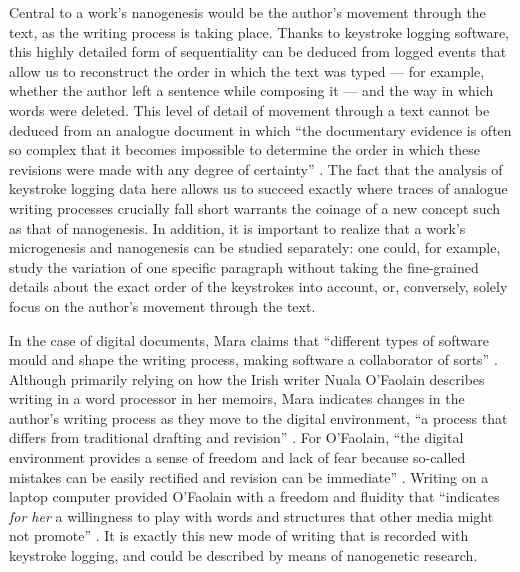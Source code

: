\begin{paper}
Central to a work's nanogenesis would be the author's movement through
the text, as the writing process is taking place. Thanks to keystroke
logging software, this highly detailed form of sequentiality can be
deduced from logged events that allow us to reconstruct the order in
which the text was typed --- for example, whether the author left a
sentence while composing it --- and the way in which words were deleted.
This level of detail of movement through a text cannot be deduced from
an analogue document in which ``the documentary evidence is often so
complex that it becomes impossible to determine the order in which these
revisions were made with any degree of certainty'' \citep[90]{dillen_digital_2015}. \renewcommand*{\thefootnote}{\arabic{footnote}}The fact that the analysis of keystroke logging data here allows us to succeed
exactly where traces of analogue writing processes crucially fall short warrants the coinage of a new concept such as that of nanogenesis.
In addition, it is important to realize that a work's microgenesis and nanogenesis can be studied separately: one could,
for example, study the variation of one specific paragraph without
taking the fine-grained details about the exact order of the keystrokes
into account, or, conversely, solely focus on the author's movement
through the text.

In the case of digital documents, Mara claims that
``different types of software mould and shape the writing process,
making software a collaborator of sorts'' \citep[344]{mara_nuala_2013}. Although
primarily relying on how the Irish writer Nuala O'Faolain describes
writing in a word processor in her memoirs, Mara indicates changes in
the author's writing process as they move to the digital environment,
``a process that differs from traditional drafting and revision''
\citep[345]{mara_nuala_2013}. For O'Faolain, ``the digital environment provides a
sense of freedom and lack of fear because so-called mistakes can be
easily rectified and revision can be immediate'' \citep[346]{mara_nuala_2013}. Writing on a laptop computer provided O'Faolain with a freedom and
fluidity that ``indicates \emph{for her} a willingness to play with
words and structures that other media might not promote''
\citep[344; emphasis in original]{mara_nuala_2013}. It is exactly this new
mode of writing that is recorded with keystroke logging, and could be
described by means of nanogenetic research.


\end{paper}
